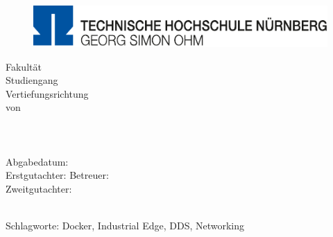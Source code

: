 \newpage
\thispagestyle{empty}
\section*{}
\newpage

\thispagestyle{empty}

\begin{titlepage}
	
	
	\begin{center}
		\begin{figure}
			\centering
			\includegraphics[width=\textwidth]{Bilder/TH_Logo.pdf}
		\end{figure}
		
		\Large{Fakultät \fakultaet}\\[4ex]
		
		\Large{Studiengang \studiengang}\\
		\Large{Vertiefungsrichtung \studienbereich}\\[7ex]
		
		\Large{{\art}  von}\\
		\Large{\autor}\\[7ex]
		\Large{\titel}\\[4ex]
		\Large{\semester}\\
		
		\vfill
		\large{Abgabedatum: \abgabedatum \hfill   \mbox{}}\\		
		\large{Erstgutachter: \erstgutachter \hfill Betreuer: \firmenbetreuerA \mbox{}}\\
		\large{Zweitgutachter: \zweitgutachter \hfill \firmenbetreuerB \mbox{}}\\
		\large{\mbox{}\hfill\firma}\\[2ex]
	\end{center}		
	\large{Schlagworte: Docker, Industrial Edge, DDS, Networking}
\end{titlepage}
\restoregeometry
